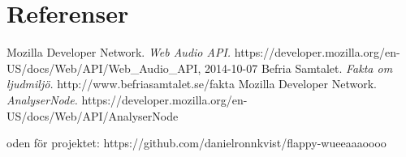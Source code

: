 \documentclass[12pt, titlepage, a4paper]{article}
\begin{document}
	\section{Referenser}
	\renewcommand{\addcontentsline}[3]{}%
  \renewcommand{\section}[2]{}%
  \begin{thebibliography}{1}
    Mozilla Developer Network.
    \emph{Web Audio API.}
    https://developer.mozilla.org/en-US/docs/Web/API/Web\_Audio\_API, 2014-10-07
    Befria Samtalet.
    \emph{Fakta om ljudmiljö.}
    http://www.befriasamtalet.se/fakta
    Mozilla Developer Network.
    \emph{AnalyserNode.}
    https://developer.mozilla.org/en-US/docs/Web/API/AnalyserNode
  \end{thebibliography}
  \section{Bilagor}
  Koden för projektet: https://github.com/danielronnkvist/flappy-wueeaaaoooo
\end{document}
